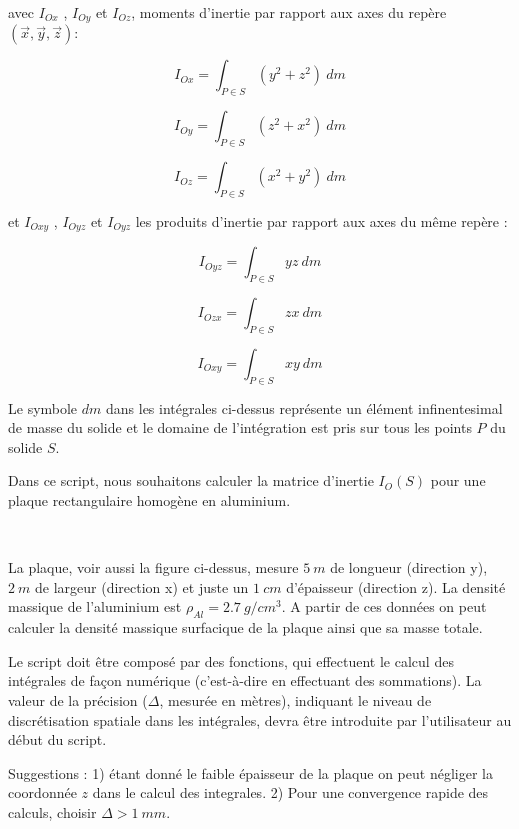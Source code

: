 \documentclass{article}
\begin{document}
    avec \(I_{Ox}\) , \(I_{Oy}\) et \(I_{Oz}\), moments d'inertie par
rapport aux axes du repère \((\vec{x},\vec{y},\vec{z})\):

    \[I_{Ox} = \int_{P\in S} (y^2+z^2)\ dm\]

\[I_{Oy} = \int_{P\in S} (z^2+x^2)\ dm\]

\[I_{Oz} = \int_{P\in S} (x^2+y^2)\ dm\]

    et \(I_{Oxy}\) , \(I_{Oyz}\) et \(I_{Oyz}\) les produits d'inertie par
rapport aux axes du même repère :

    \[I_{Oyz} = \int_{P\in S} yz \ dm\]

\[I_{Ozx} = \int_{P\in S} zx \ dm\]

\[I_{Oxy} = \int_{P\in S} xy \ dm\]

    Le symbole \(dm\) dans les intégrales ci-dessus représente un élément
infinentesimal de masse du solide et le domaine de l'intégration est
pris sur tous les points \(P\) du solide \(S\).

    Dans ce script, nous souhaitons calculer la matrice d'inertie
\(I_{O}(S)\) pour une plaque rectangulaire homogène en aluminium.

    
    \begin{center}
    \end{center}
    { \hspace*{\fill} \\}
    

    La plaque, voir aussi la figure ci-dessus, mesure \(5\ m\) de longueur
(direction y), \(2\ m\) de largeur (direction x) et juste un \(1 \ cm\)
d'épaisseur (direction z). La densité massique de l'aluminium est
\(\rho_{Al} = 2.7 \ g / cm^{3}\). A partir de ces données on peut
calculer la densité massique surfacique de la plaque ainsi que sa masse
totale.

Le script doit être composé par des fonctions, qui effectuent le calcul
des intégrales de façon numérique (c'est-à-dire en effectuant des
sommations). La valeur de la précision (\(\Delta\), mesurée en mètres),
indiquant le niveau de discrétisation spatiale dans les intégrales,
devra être introduite par l'utilisateur au début du script.

Suggestions : 1) étant donné le faible épaisseur de la plaque on peut
négliger la coordonnée \(z\) dans le calcul des integrales. 2) Pour une
convergence rapide des calculs, choisir \(\Delta > 1\ mm\).
\end{document}
